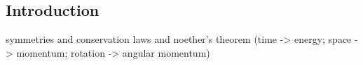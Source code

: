 
\subsection{Introduction}

symmetries and conservation laws and noether's theorem (time -> energy; space -> momentum; rotation -> angular momentum)


